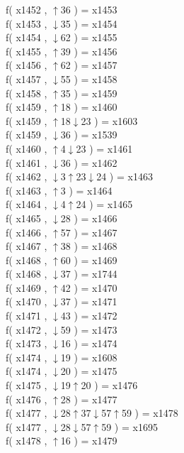 f( x1452 , $\uparrow$36 ) = x1453 \\
f( x1453 , $\downarrow$35 ) = x1454 \\
f( x1454 , $\downarrow$62 ) = x1455 \\
f( x1455 , $\uparrow$39 ) = x1456 \\
f( x1456 , $\uparrow$62 ) = x1457 \\
f( x1457 , $\downarrow$55 ) = x1458 \\
f( x1458 , $\uparrow$35 ) = x1459 \\
f( x1459 , $\uparrow$18 ) = x1460 \\
f( x1459 , $\uparrow$18$\downarrow$23 ) = x1603 \\
f( x1459 , $\downarrow$36 ) = x1539 \\
f( x1460 , $\uparrow$4$\downarrow$23 ) = x1461 \\
f( x1461 , $\downarrow$36 ) = x1462 \\
f( x1462 , $\downarrow$3$\uparrow$23$\downarrow$24 ) = x1463 \\
f( x1463 , $\uparrow$3 ) = x1464 \\
f( x1464 , $\downarrow$4$\uparrow$24 ) = x1465 \\
f( x1465 , $\downarrow$28 ) = x1466 \\
f( x1466 , $\uparrow$57 ) = x1467 \\
f( x1467 , $\uparrow$38 ) = x1468 \\
f( x1468 , $\uparrow$60 ) = x1469 \\
f( x1468 , $\downarrow$37 ) = x1744 \\
f( x1469 , $\uparrow$42 ) = x1470 \\
f( x1470 , $\downarrow$37 ) = x1471 \\
f( x1471 , $\downarrow$43 ) = x1472 \\
f( x1472 , $\downarrow$59 ) = x1473 \\
f( x1473 , $\downarrow$16 ) = x1474 \\
f( x1474 , $\downarrow$19 ) = x1608 \\
f( x1474 , $\downarrow$20 ) = x1475 \\
f( x1475 , $\downarrow$19$\uparrow$20 ) = x1476 \\
f( x1476 , $\uparrow$28 ) = x1477 \\
f( x1477 , $\downarrow$28$\uparrow$37$\downarrow$57$\uparrow$59 ) = x1478 \\
f( x1477 , $\downarrow$28$\downarrow$57$\uparrow$59 ) = x1695 \\
f( x1478 , $\uparrow$16 ) = x1479 \\
